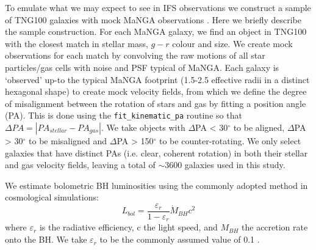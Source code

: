 \documentclass[fleqn,usenatbib]{mnras}
\begin{document}
To emulate what we may expect to see in IFS observations we construct a sample of TNG100 galaxies with mock MaNGA observations \citep[a complete description is given in][]{duckworth2019}. Here we briefly describe the sample construction. 
For each MaNGA galaxy, we find an object in TNG100 with the closest match in stellar mass, $g-r$ colour and size. We create mock observations for each match by convolving the raw motions of all star particles/gas cells with noise and PSF typical of MaNGA. Each galaxy is `observed' up-to the typical MaNGA footprint (1.5-2.5 effective radii in a distinct hexagonal shape) to create mock velocity fields, from which we define the degree of misalignment between the rotation of stars and gas by fitting a position angle (PA). This is done using the \texttt{fit\_kinematic\_pa} routine \citep[see Appendix C of][]{krajnovic2006} so that $\Delta PA = |PA_{stellar} - PA_{gas}|$. We take objects with $\Delta$PA < 30$^{\circ}$ to be aligned, $\Delta$PA > 30$^{\circ}$ to be misaligned and $\Delta$PA > 150$^{\circ}$ to be counter-rotating. We only select galaxies that have distinct PAs (i.e. clear, coherent rotation) in both their stellar and gas velocity fields, leaving a total of $\sim$3600 galaxies used in this study. 

We estimate bolometric BH luminosities using the commonly adopted method in cosmological simulations: 
\begin{equation}
L_{bol} = \frac{\varepsilon_r}{1 - \varepsilon_r} \dot{M}_{BH} c^2
\end{equation}
where $\varepsilon_r$ is the radiative efficiency, c the light speed, and $M_{BH}$ the accretion rate onto the BH. We take $\varepsilon_r$ to be the commonly assumed value of 0.1 \citep[see discussion in][]{habouzit2019}.
\end{document}
